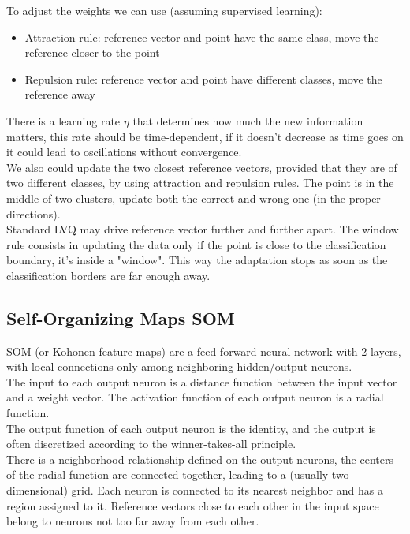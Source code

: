 To adjust the weights we can use (assuming supervised learning):
\begin{itemize}
	\item Attraction rule: reference vector and point have the same class, move the reference closer to the point
	\item Repulsion rule: reference vector and point have different classes, move the reference away
\end{itemize}
There is a learning rate $\eta$ that determines how much the new information matters, this rate should be time-dependent, if it doesn't decrease as time goes on it could lead to oscillations without convergence.\\

We also could update the two closest reference vectors, provided that they are of two different classes, by using attraction and repulsion rules. The point is in the middle of two clusters, update both the correct and wrong one (in the proper directions).\\

Standard LVQ may drive reference vector further and further apart. The window rule consists in updating the data only if the point is close to the classification boundary, it's inside a "window". This way the adaptation stops as soon as the classification borders are far enough away.\\

\subsection{Self-Organizing Maps SOM}

SOM (or Kohonen feature maps) are a feed forward neural network with 2 layers, with local connections only among neighboring hidden/output neurons.\\

The input to each output neuron is a distance function between the input vector and a weight vector. The activation function of each output neuron is a radial function.\\

The output function of each output neuron is the identity, and the output is often discretized according to the winner-takes-all principle.\\

There is a neighborhood relationship defined on the output neurons, the centers of the radial function are connected together, leading to a (usually two-dimensional) grid. Each neuron is connected to its nearest neighbor and has a region assigned to it. Reference vectors close to each other in the input space belong to neurons not too far away from each other.\\

